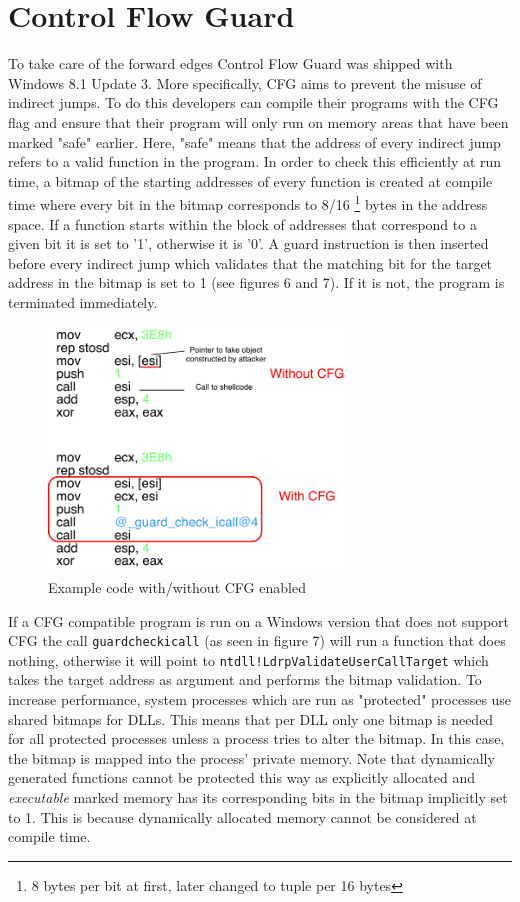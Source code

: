 \documentclass[10pt,twocolumn,a4paper]{article}
\begin{document}
\section{Control Flow Guard}\label{CFG}
To take care of the forward edges Control Flow Guard was shipped with Windows 8.1 Update 3.
More specifically, CFG aims to prevent the misuse of indirect jumps.
To do this developers can compile their programs with the CFG flag and ensure that their program will only run on memory areas that have been marked "safe" earlier\cite{CFG2}.
Here, "safe" means that the address of every indirect jump refers to a valid function in the program.
In order to check this efficiently at run time, a bitmap of the starting addresses of every function is created at compile time where every bit in the bitmap corresponds to 8/16 \footnote{8 bytes per bit at first, later changed to tuple per 16 bytes} bytes in the address space.
If a function starts within the block of addresses that correspond to a given bit it is set to '1', otherwise it is '0'.
A guard instruction is then inserted before every indirect jump which validates that the matching bit for the target address in the bitmap is set to 1 (see figures 6 and 7). If it is not, the program is terminated immediately.
\begin{figure}[htbp]
	\includegraphics[keepaspectratio,width=8cm]{fig/cfg}
	\caption{Example code with/without CFG enabled\textsuperscript{\cite{cfgexplore}}}
\end{figure}
If a CFG compatible program is run on a Windows version that does not support CFG the call \texttt{\textunderscore guard\textunderscore check\textunderscore icall} (as seen in figure 7) will run a function that does nothing, otherwise it will point to \texttt{ntdll!LdrpValidateUserCallTarget} which takes the target address as argument and performs the bitmap validation\cite{cfgexplore}.
To increase performance, system processes which are run as "protected" processes use shared bitmaps for DLLs.
This means that per DLL only one bitmap is needed for all protected processes unless a process tries to alter the bitmap. In this case, the bitmap is mapped into the process' private memory\cite{cfginternals}.
Note that dynamically generated functions cannot be protected this way as explicitly allocated and \emph{executable} marked memory has its corresponding bits in the bitmap implicitly set to 1\cite{cfgexplore}.
This is because dynamically allocated memory cannot be considered at compile time.
\end{document}
